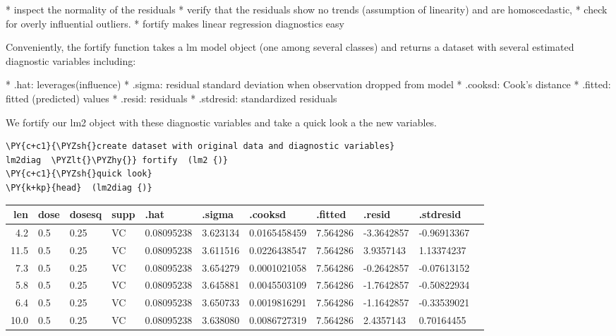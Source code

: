 * 
  inspect the normality of the residuals
* 
  verify that the residuals show no trends (assumption of linearity) and
  are homoscedastic,
* 
  check for overly influential outliers.
* 
  fortify makes linear regression diagnostics easy


    Conveniently, the fortify function takes a lm model object (one among
several classes) and returns a dataset with several estimated diagnostic
variables including:



* 
  .hat: leverages(influence)
* 
  .sigma: residual standard deviation when observation dropped from
  model
* 
  .cooksd: Cook's distance
* 
  .fitted: fitted (predicted) values
* 
  .resid: residuals
* 
  .stdresid: standardized residuals


We fortify our lm2 object with these diagnostic variables and take a
quick look a the new variables.

    \begin{tcolorbox}[breakable, size=fbox, boxrule=1pt, pad at break*=1mm,colback=cellbackground, colframe=cellborder]
\begin{Verbatim}[commandchars=\\\{\}]
\PY{c+c1}{\PYZsh{}create dataset with original data and diagnostic variables}
lm2diag  \PYZlt{}\PYZhy{}} fortify  (lm2 {)}
\PY{c+c1}{\PYZsh{}quick look}
\PY{k+kp}{head}  (lm2diag {)}
\end{Verbatim}
\end{tcolorbox}

    \begin{tabular}{r|llllllllll}
 len & dose & dosesq & supp & .hat & .sigma & .cooksd & .fitted & .resid & .stdresid\\
\hline
	  4.2         & 0.5          & 0.25         & VC           & 0.08095238   & 3.623134     & 0.0165458459 & 7.564286     & -3.3642857   & -0.96913367 \\
	 11.5         & 0.5          & 0.25         & VC           & 0.08095238   & 3.611516     & 0.0226438547 & 7.564286     &  3.9357143   &  1.13374237 \\
	  7.3         & 0.5          & 0.25         & VC           & 0.08095238   & 3.654279     & 0.0001021058 & 7.564286     & -0.2642857   & -0.07613152 \\
	  5.8         & 0.5          & 0.25         & VC           & 0.08095238   & 3.645881     & 0.0045503109 & 7.564286     & -1.7642857   & -0.50822934 \\
	  6.4         & 0.5          & 0.25         & VC           & 0.08095238   & 3.650733     & 0.0019816291 & 7.564286     & -1.1642857   & -0.33539021 \\
	 10.0         & 0.5          & 0.25         & VC           & 0.08095238   & 3.638080     & 0.0086727319 & 7.564286     &  2.4357143   &  0.70164455 \\
\end{tabular}


